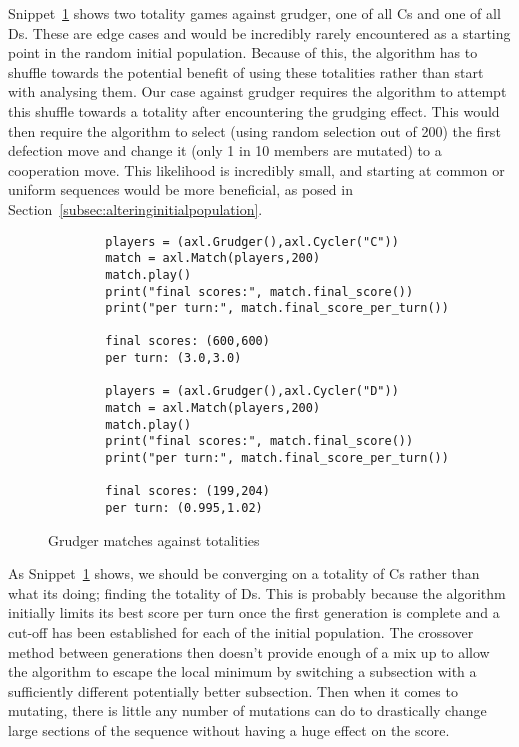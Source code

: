 Snippet~\ref{code:gudgerTotailites} shows two totality games against grudger, one of all Cs and one of all Ds.
These are edge cases and would be incredibly rarely encountered as a starting point in the random initial population.
Because of this, the algorithm has to shuffle towards the potential benefit of using these totalities rather than start with analysing them.
Our case against grudger requires the algorithm to attempt this shuffle towards a totality after encountering the grudging effect.
This would then require the algorithm to select (using random selection out of 200) the first defection move and change it (only 1 in 10 members are mutated) to a cooperation move.
This likelihood is incredibly small, and starting at common or uniform sequences would be more beneficial, as posed in Section~\ref{subsec:alteringinitialpopulation}.\\

\begin{figure}
    \begin{verbatim}
        players = (axl.Grudger(),axl.Cycler("C"))
        match = axl.Match(players,200)
        match.play()
        print("final scores:", match.final_score())
        print("per turn:", match.final_score_per_turn())

        final scores: (600,600)
        per turn: (3.0,3.0)

        players = (axl.Grudger(),axl.Cycler("D"))
        match = axl.Match(players,200)
        match.play()
        print("final scores:", match.final_score())
        print("per turn:", match.final_score_per_turn())

        final scores: (199,204)
        per turn: (0.995,1.02)
    \end{verbatim}
    \caption{Grudger matches against totalities}\label{code:gudgerTotailites}
\end{figure}

As Snippet~\ref{code:gudgerTotailites} shows, we should be converging on a totality of Cs rather than what its doing;
finding the totality of Ds.
This is probably because the algorithm initially limits its best score per turn once the first generation is complete and a cut-off has been established for each of the initial population.
The crossover method between generations then doesn't provide enough of a mix up to allow the algorithm to escape the local minimum by switching a subsection with a sufficiently different potentially better subsection.
Then when it comes to mutating, there is little any number of mutations can do to drastically change large sections of the sequence without having a huge effect on the score.\\

